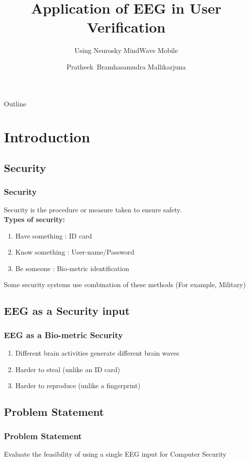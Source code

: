 \documentclass[unknownkeysallowed]{beamer}
\title[MS Thesis Defense] %
{Application of EEG in User Verification}
\subtitle{Using Neurosky MindWave Mobile} %
\author[First Last] %
{Pratheek~Bramhasamudra Mallikarjuna}
\institute[NCSU]
{
  Department of Electrical and Computer Engineering\\%
  North Carolina State University
}
\begin{document}
\begin{frame}
  \titlepage
\end{frame}
\begin{frame}{Outline}
\tableofcontents
\end{frame}

\section{Introduction}

\subsection{Security}

\begin{frame}
	\frametitle{Security}
    Security is the procedure or measure taken to ensure safety.\\

    \pause
    \textbf{Types of security:}
    \pause
    \begin{enumerate}
    	\item Have something : ID card
    	\item Know something : User-name/Password
    	\item Be someone : Bio-metric identification
    \end{enumerate}
    \pause
    Some security systems use combination of these methods (For example, Military)	
\end{frame}

\subsection{EEG as a Security input}
\begin{frame}
	\frametitle{EEG as a Bio-metric Security}
    \begin{enumerate}
    	\item Different brain activities generate different brain waves
        \pause
        \item Harder to steal (unlike an ID card)
        \pause
        \item Harder to reproduce (unlike a fingerprint)
    \end{enumerate}
\end{frame}

\subsection{Problem Statement}
\begin{frame}
	\frametitle{Problem Statement}
    Evaluate the feasibility of using a single EEG input for Computer Security
\end{frame}
\end{document}
